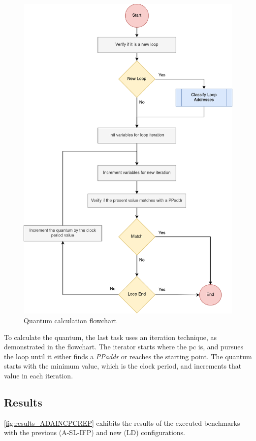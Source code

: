\begin{figure}[H]
	\centering
 	\includegraphics[width=0.5\linewidth]{Images/Repetition_flowchart_quantum.png}
 	\caption{Quantum calculation flowchart}
	 \label{fig_Repetition_flowchart_quantum}
\end{figure}

To calculate the quantum, the last task uses an iteration technique, as demonstrated in the flowchart. 
The iterator starts where the \gls{pc} is, and pursues the loop until it either finds a \textit{PPaddr} or reaches the starting point. 
The quantum starts with the minimum value, which is the clock period, and increments that value in each iteration.

\subsection{Results}

\autoref{fig:results_ADAINCPCREP} exhibits the results of the executed benchmarks with the previous (A-SL-IFP) and new (LD) configurations. 

